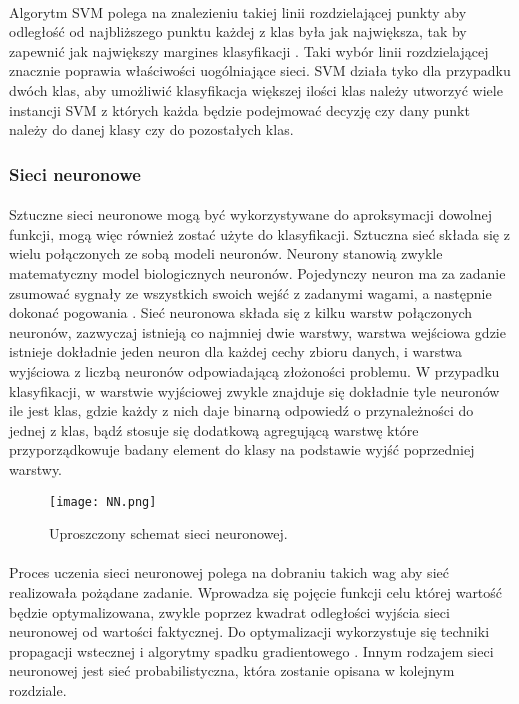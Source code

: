 \documentclass[a4paper,12pt,twoside]{article}
\begin{document}
\paragraph{}
Algorytm SVM polega na znalezieniu takiej linii rozdzielającej punkty aby odległość od najbliższego punktu każdej z klas była jak największa, tak by zapewnić jak największy margines klasyfikacji \cite{svm}. Taki wybór linii rozdzielającej znacznie poprawia właściwości uogólniające sieci. SVM działa tyko dla przypadku dwóch klas, aby umożliwić klasyfikacja większej ilości klas należy utworzyć wiele instancji SVM z których każda będzie podejmować decyzję czy dany punkt należy do danej klasy czy do pozostałych klas. 

\newpage
\subsubsection{Sieci neuronowe}
\paragraph{}
Sztuczne sieci neuronowe mogą być wykorzystywane do aproksymacji dowolnej funkcji, mogą więc również zostać użyte do klasyfikacji. Sztuczna sieć składa się z wielu połączonych ze sobą modeli neuronów. Neurony stanowią zwykle matematyczny model biologicznych neuronów. Pojedynczy neuron ma za zadanie zsumować sygnały ze wszystkich swoich wejść z zadanymi wagami, a następnie dokonać pogowania \cite{nn}. Sieć neuronowa składa się z kilku warstw  połączonych neuronów, zazwyczaj istnieją co najmniej dwie warstwy, warstwa wejściowa gdzie istnieje dokładnie jeden neuron dla każdej cechy zbioru danych, i warstwa wyjściowa z liczbą neuronów odpowiadającą złożoności problemu. W przypadku klasyfikacji, w warstwie wyjściowej zwykle znajduje się dokładnie tyle neuronów ile jest klas, gdzie każdy z nich daje binarną odpowiedź o przynależności do jednej z klas, bądź stosuje się dodatkową agregującą warstwę które przyporządkowuje badany element do klasy na podstawie wyjść poprzedniej warstwy. 
\begin{figure}[h]
    \centering
    \texttt{[image: NN.png]}
    \caption{Uproszczony schemat sieci neuronowej.}
\end{figure}
\paragraph{}
Proces uczenia sieci neuronowej polega na dobraniu takich wag aby sieć realizowała pożądane zadanie. Wprowadza się pojęcie funkcji celu której wartość będzie optymalizowana, zwykle poprzez kwadrat odległości wyjścia sieci neuronowej od wartości faktycznej. Do optymalizacji wykorzystuje się techniki propagacji wstecznej i algorytmy spadku gradientowego \cite{nn}.
Innym rodzajem sieci neuronowej jest sieć probabilistyczna, która zostanie opisana w kolejnym rozdziale.
\newpage
\thispagestyle{empty}
\mbox{}
\end{document}
